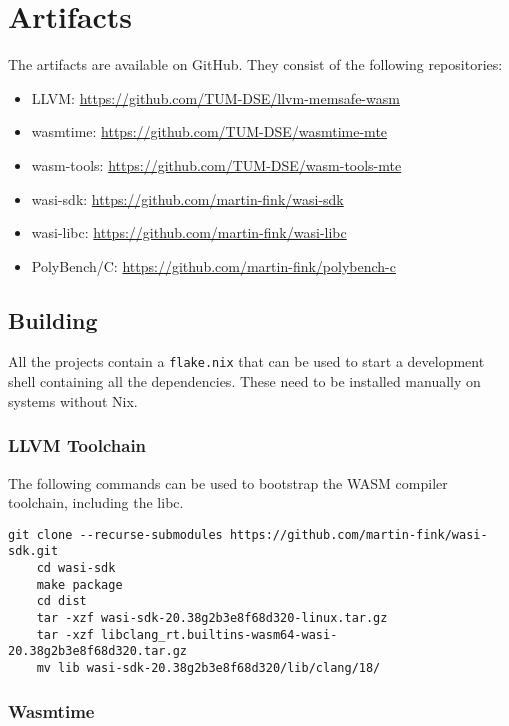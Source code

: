 \chapter{Artifacts}
\label{ch:artifacts}

The artifacts are available on GitHub.
They consist of the following repositories:

\begin{itemize}
    \item LLVM: \url{https://github.com/TUM-DSE/llvm-memsafe-wasm}
    \item wasmtime: \url{https://github.com/TUM-DSE/wasmtime-mte}
    \item wasm-tools: \url{https://github.com/TUM-DSE/wasm-tools-mte}
    \item wasi-sdk: \url{https://github.com/martin-fink/wasi-sdk}
    \item wasi-libc: \url{https://github.com/martin-fink/wasi-libc}
    \item PolyBench/C: \url{https://github.com/martin-fink/polybench-c}
\end{itemize}

\section{Building}
\label{sec:building}

All the projects contain a \texttt{flake.nix} that can be used to start a development shell containing all the dependencies.
These need to be installed manually on systems without Nix.

\subsection{LLVM Toolchain}
\label{subsec:llvm-toolchain}

The following commands can be used to bootstrap the \ac{WASM} compiler toolchain, including the libc.

\begin{lstlisting}[label={lst:building-sdk}]
    git clone --recurse-submodules https://github.com/martin-fink/wasi-sdk.git
    cd wasi-sdk
    make package
    cd dist
    tar -xzf wasi-sdk-20.38g2b3e8f68d320-linux.tar.gz
    tar -xzf libclang_rt.builtins-wasm64-wasi-20.38g2b3e8f68d320.tar.gz
    mv lib wasi-sdk-20.38g2b3e8f68d320/lib/clang/18/
\end{lstlisting}

\subsection{Wasmtime}
\label{subsec:building-wasmtime}

